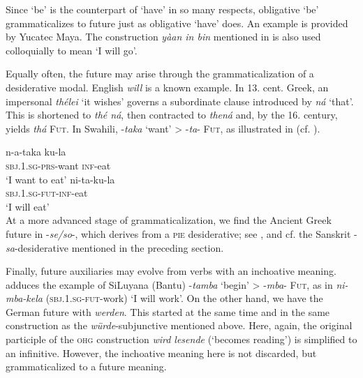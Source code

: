 Since ‘be’ is the counterpart of ‘have’ in so many respects, obligative ‘be’ grammaticalizes to future just as obligative ‘have’ does. An example is provided by Yucatec Maya. The construction \textit{yàan in bin} mentioned in  is also used colloquially to mean ‘I will go’.

Equally often, the future may arise through the grammaticalization of a desiderative modal. English \textit{will} is a known example. In 13. cent. Greek, an impersonal \textit{thélei} ‘it wishes’ governs a subordinate clause introduced by \textit{ná} ‘that’. This is shortened to \textit{thé ná}, then contracted to \textit{thená} and, by the 16. century, yields \textit{thá} \textsc{Fut}. In Swahili, -\textit{taka} ‘want’ {\textgreater} -\textit{ta}{}- \textsc{Fut}, as illustrated in  (cf. \citealt[131]{HeineEtAl1984}).


\ea\label{ex:E2}
 \ea
 \gll n-a-taka ku-la \\   
 \textsc{sbj}.1.\textsc{sg}-\textsc{prs}-want  \textsc{inf}-eat  \\
\glt ‘I want to eat’
 \ex
 \gll ni-ta-ku-la \\
 \textsc{sbj}.1.\textsc{sg}-\textsc{fut}-\textsc{inf}-eat\\
 \glt ‘I will eat’ \\
\z
\z
\noindent At a more advanced stage of grammaticalization, we find the Ancient Greek future in -\textit{se/so}{}-, which derives from a \textsc{pie} desiderative; see \citet[224f]{Rix1976}, and cf. the Sanskrit -\textit{sa}{}-desiderative mentioned in the preceding section.

Finally, future auxiliaries may evolve from verbs with an inchoative meaning. \citet[917]{Givón1973} adduces the example of SiLuyana (Bantu) -\textit{tamba} ‘begin’ {\textgreater} -\textit{mba}{}- \textsc{Fut}, as in \textit{ni-mba-kela} (\textsc{sbj}.1.\textsc{sg}{}-\textsc{fut}{}-work) ‘I will work’. On the other hand, we have the German future with \textit{werden}. This started at the same time and in the same construction as the \textit{würde}{}-subjunctive mentioned above. Here, again, the original participle of the \textsc{ohg} construction \textit{wird lesende} (‘becomes reading’) is simplified to an infinitive. However, the inchoative meaning here is not discarded, but grammaticalized to a future meaning.

